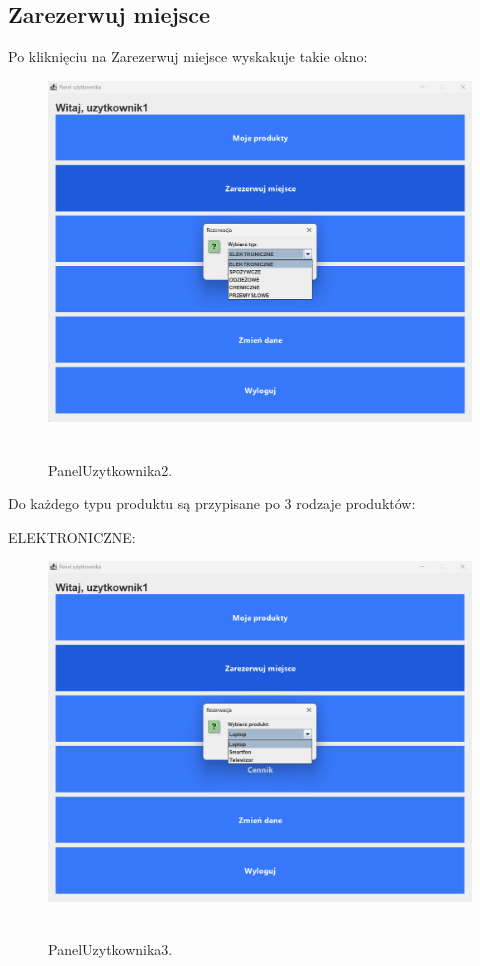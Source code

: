\subsection{Zarezerwuj miejsce}
\label{subsec:Zarezerwuj miejsce}

Po kliknięciu na Zarezerwuj miejsce wyskakuje takie okno:

\begin{figure}[H]
    \centering
    \includegraphics[width=.9\linewidth]{figures/PanelUzytkownika2.png}\
    \caption{PanelUzytkownika2.\label{PanelUzytkownika2}}
\end{figure}

Do każdego typu produktu są przypisane po 3 rodzaje produktów:

ELEKTRONICZNE:
\begin{figure}[H]
    \centering
    \includegraphics[width=.9\linewidth]{figures/PanelUzytkownika3.png}\
    \caption{PanelUzytkownika3.\label{PanelUzytkownika3}}
\end{figure}

